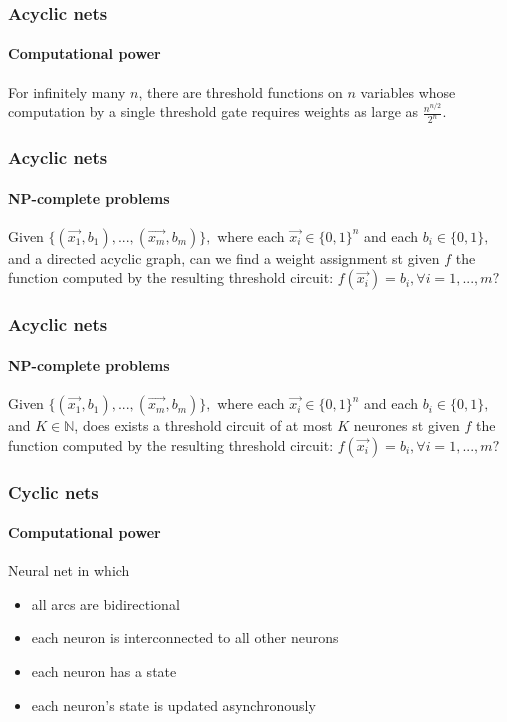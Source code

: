\documentclass{beamer}
\begin{document}
\begin{frame}
\frametitle{Acyclic nets}
\framesubtitle{Computational power}	
\begin{theorem}
For infinitely many $n$, there are threshold functions on $n$ variables whose computation by a single threshold gate requires weights as large as $\frac{n^{n/2}}{2^n}.$
\end{theorem}
\end{frame}


\begin{frame}
\frametitle{Acyclic nets}
\framesubtitle{NP-complete problems}
\begin{definition}
	Given $\{(\vec{x_1}, b_1),...,(\vec{x_m}, b_m)\},$ where each $\vec{x_i} \in \{0,1\}^n$ and each $b_i \in \{0, 1\},$ and a directed acyclic graph, can we find a weight assignment st given $f$ the function computed by the resulting threshold circuit: $f(\vec{x_i})=b_i, \forall i = 1,...,m ?$
\end{definition}
\end{frame}

\begin{frame}
\frametitle{Acyclic nets}
\framesubtitle{NP-complete problems}
\begin{definition}
Given $\{(\vec{x_1}, b_1),...,(\vec{x_m}, b_m)\},$ where each $\vec{x_i} \in \{0,1\}^n$ and each $b_i \in \{0, 1\},$ and $K \in \mathbb{N}$, does exists a threshold circuit of at most $K$ neurones st given $f$ the function computed by the resulting threshold circuit: $f(\vec{x_i})=b_i, \forall i = 1,...,m ?$
\end{definition}
\end{frame}

\begin{frame}
\frametitle{Cyclic nets}
\framesubtitle{Computational power}
\begin{definition}
Neural net in which
\begin{itemize}
	\item all arcs are bidirectional
	\item each neuron is interconnected to all other neurons
	\item each neuron has a state
	\item each neuron's state is updated asynchronously
	
\end{itemize}
\end{definition}
\end{frame}
\end{document}
